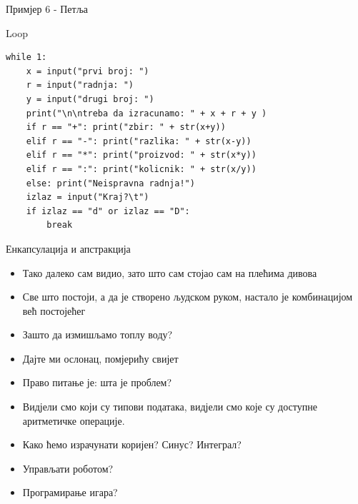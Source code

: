 \documentclass{beamer}
\begin{document}
\begin{frame}[fragile]{Примјер 6 - Петља}
\begin{block}{Loop}
\begin{lstlisting}
while 1:
    x = input("prvi broj: ")
    r = input("radnja: ")
    y = input("drugi broj: ")
    print("\n\ntreba da izracunamo: " + x + r + y )
    if r == "+": print("zbir: " + str(x+y))
    elif r == "-": print("razlika: " + str(x-y))
    elif r == "*": print("proizvod: " + str(x*y))
    elif r == ":": print("kolicnik: " + str(x/y))
    else: print("Neispravna radnja!")
    izlaz = input("Kraj?\t")
    if izlaz == "d" or izlaz == "D":
        break
\end{lstlisting}
\end{block}
\end{frame}

\begin{frame}{Енкапсулација и апстракција}
\begin{itemize}
    \item Тако далеко сам видио, зато што сам стојао сам на плећима дивова
    \item Све што постоји, а да је створено људском руком, настало је комбинацијом већ постојећег
    \item Зашто да измишљамо топлу воду?
    \item Дајте ми ослонац, помјерићу свијет
    \item Право питање је: шта је проблем?
    \item Видјели смо који су типови података, видјели смо које су доступне аритметичке операције.
    \item Како ћемо израчунати коријен? Синус? Интеграл? 
    \item Управљати роботом?
    \item Програмирање игара?
\end{itemize}
\end{frame}
\end{document}
